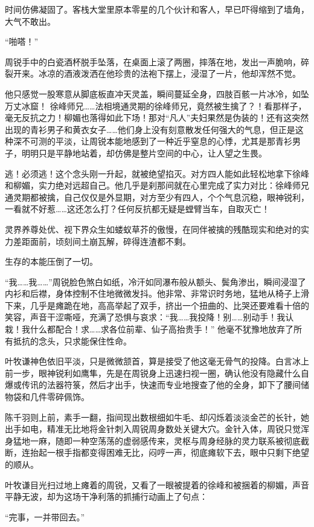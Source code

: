 时间仿佛凝固了。客栈大堂里原本零星的几个伙计和客人，早已吓得缩到了墙角，大气不敢出。

“啪嗒！”

周锐手中的白瓷酒杯脱手坠落，在桌面上滚了两圈，摔落在地，发出一声脆响，碎裂开来。冰凉的酒液泼洒在他珍贵的法袍下摆上，浸湿了一片，他却浑然不觉。

他只感觉一股寒意从脚底板直冲天灵盖，瞬间蔓延全身，四肢百骸一片冰冷，如坠万丈冰窟！ 徐峰师兄……法相境通灵期的徐峰师兄，竟然被生擒了？！看那样子，毫无反抗之力！柳媚也落得如此下场！那对“凡人”夫妇果然是伪装的！还有这突然出现的青衫男子和黄衣女子……他们身上没有刻意散发任何强大的气息，但正是这种深不可测的平淡，让周锐本能地感到了一种近乎窒息的心悸，尤其是那青衫男子，明明只是平静地站着，却仿佛是整片空间的中心，让人望之生畏。

逃！必须逃！这个念头刚一升起，就被绝望掐灭。对方四人能如此轻松地拿下徐峰和柳媚，实力绝对远超自己。他几乎是刹那间就在心里完成了实力对比：徐峰师兄通灵期都被擒，自己仅仅是外显期，对方至少有四人，个个气息沉稳，眼神锐利，一看就不好惹……这还怎么打？任何反抗都无疑是螳臂当车，自取灭亡！

灵界养尊处优、视下界众生如蝼蚁草芥的傲慢，在同伴被擒的残酷现实和绝对的实力差距面前，顷刻间土崩瓦解，碎得连渣都不剩。

生存的本能压倒了一切。

“我……我……”周锐脸色煞白如纸，冷汗如同瀑布般从额头、鬓角渗出，瞬间浸湿了内衫和后襟，身体控制不住地微微发抖。他非常、非常识时务地，猛地从椅子上滑下来，几乎是瘫跪在地，高高举起了双手，挤出一个扭曲的、比哭还要难看十倍的笑容，声音干涩嘶哑，充满了恐惧与哀求：“我……我投降！别……别动手！我认栽！我什么都配合！求……求各位前辈、仙子高抬贵手！” 他毫不犹豫地放弃了所有抵抗的念头，只求能保住性命。

叶牧谦神色依旧平淡，只是微微颔首，算是接受了他这毫无骨气的投降。白言冰上前一步，眼神锐利如鹰隼，先是在周锐身上迅速扫视一圈，确认他没有隐藏什么自爆或传讯的法器符箓，然后才出手，快速而专业地搜查了他的全身，卸下了腰间储物袋和几件零碎佩饰。

陈千羽则上前，素手一翻，指间现出数根细如牛毛、却闪烁着淡淡金芒的长针，她出手如电，精准无比地将金针刺入周锐周身数处关键大穴。金针入体，周锐只觉浑身猛地一麻，随即一种空荡荡的虚弱感传来，灵枢与周身经脉的灵力联系被彻底截断，连抬起一根手指都变得困难无比，闷哼一声，彻底瘫软下去，眼中只剩下绝望的顺从。

叶牧谦目光扫过地上瘫着的周锐，又看了一眼被提着的徐峰和被捆着的柳媚，声音平静无波，却为这场干净利落的抓捕行动画上了句点：

“完事，一并带回去。”


